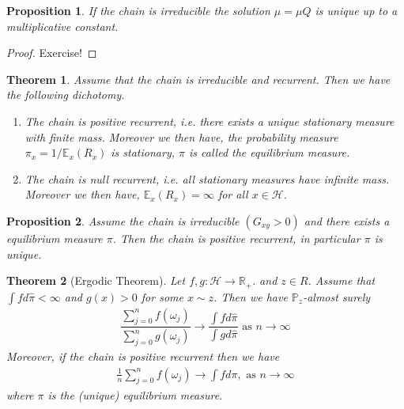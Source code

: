 \documentclass[11pt,a4paper, final]{article}
\newtheorem{thm}{Theorem}[section]
\newtheorem{prop}{Proposition}[section]
\theoremstyle{definition}
\begin{document}
\begin{prop} If the chain is irreducible the solution $\mu = \mu Q$ is unique up to a multiplicative constant. 
\end{prop}
\begin{proof}
Exercise! 
\end{proof}
\begin{thm} Assume that the chain is irreducible and recurrent. Then we have the following dichotomy. 
\begin{enumerate}
\item The chain is positive recurrent, i.e. there exists a unique stationary measure with finite mass. Moreover we then have, the probability measure $ \pi_x = 1/ \mathbb{E}_x(R_x)$ is stationary, $\pi$ is called the equilibrium measure. 
\item The chain is null recurrent, i.e. all stationary measures have infinite mass. Moreover we then have, $\mathbb{E}_x(R_x) =  \infty$ for all $x \in \mathcal{H}$. 
\end{enumerate}
\end{thm}
\begin{prop} Assume the chain is irreducible $(G_{xy} >0)$ and there exists a equilibrium measure $\pi$. Then the chain is positive recurrent, in particular $\pi$ is unique. 
\end{prop}
\newpage
\begin{thm}[Ergodic Theorem] Let $f,g: \mathcal{H} \to \mathbb{R}_+.$ and $z \in R$. Assume that $\int f d \hat{\pi} < \infty$ and $g(x) >0$ for some $x \sim z$. Then we have $\mathbb{P}_z$-almost surely
\begin{align*}
\dfrac{\sum_{j=0}^n f( \omega_j)}{\sum_{j=0}^n g( \omega_j)} \to \dfrac{\int f d \hat{\pi}}{\int g d \hat{\pi}} \text{ as } n \to \infty 
\end{align*}
Moreover, if the chain is positive recurrent then we have 
\begin{align*}
\frac{1}{n} \sum_{j=0}^n f( \omega_j) \to \int f d \pi, \text{ as } n \to \infty
\end{align*}
where $\pi$ is the (unique) equilibrium measure. 
\end{thm}
\end{document}
